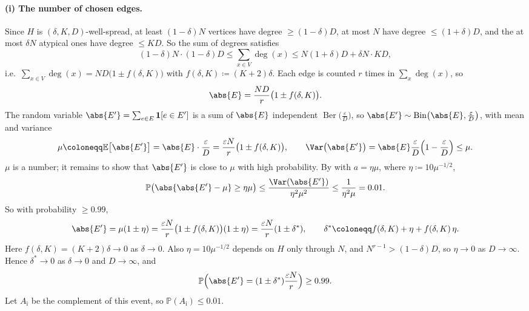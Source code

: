 \paragraph{(i) The number of chosen edges.} Since \(H\) is \((\delta, K, D)\)-well-spread, at least \((1 - \delta) N\) vertices have degree \(\ge (1 - \delta) D\), at most \(N\) have degree \(\le (1 + \delta) D\), and the at most \(\delta N\) atypical ones have degree \(\le K D\). So the sum of degrees satisfies
\[
    (1 - \delta) N \cdot (1 - \delta) D \le \sum_{x \in V} \deg(x) \le N (1 + \delta) D + \delta N \cdot K D ,
\]
i.e.\ \(\sum_{x \in V} \deg(x) = N D \bigl( 1 \pm f(\delta, K) \bigr)\)
with \(f(\delta, K) \coloneqq (K + 2)\delta\). Each edge is counted \(r\) times in \(\sum_{x} \deg(x)\), so
\[
    \abs{E} = \frac{N D}{r} \bigl( 1 \pm f(\delta, K) \bigr).
\]
The random variable \(\abs{E'} = \sum_{e \in E} \mathbf{1}[e \in E']\) is a sum of \(\abs{E}\) independent \(\operatorname{Ber}\bigl( \frac{\varepsilon}{D} \bigr)\), so \(\abs{E'} \sim \operatorname{Bin}\bigl( \abs{E}, \frac{\varepsilon}{D} \bigr)\), with mean and variance
\[
    \mu \coloneqq \mathbb{E}\bigl[ \abs{E'} \bigr] = \abs{E} \cdot \frac{\varepsilon}{D} = \frac{\varepsilon N}{r} \bigl( 1 \pm f(\delta, K) \bigr),
    \qquad
    \Var\bigl( \abs{E'} \bigr) = \abs{E} \frac{\varepsilon}{D} \Bigl( 1 - \frac{\varepsilon}{D} \Bigr) \le \mu .
\]
\(\mu\) is a number; it remains to show that \(\abs{E'}\) is close to \(\mu\) with high probability. By  with \(a = \eta \mu\), where \(\eta \coloneqq 10 \mu^{-1/2}\),
\[
    \mathbb{P}\bigl( \abs{\abs{E'} - \mu} \ge \eta \mu \bigr) \le \frac{\Var(\abs{E'})}{\eta^{2} \mu^{2}} \le \frac{1}{\eta^{2} \mu} = 0.01 .
\]
So with probability \(\ge 0.99\),
\[
    \abs{E'} = \mu (1 \pm \eta) = \frac{\varepsilon N}{r} \bigl( 1 \pm f(\delta, K) \bigr)(1 \pm \eta) = \frac{\varepsilon N}{r} (1 \pm \delta^{*}),
    \qquad
    \delta^{*} \coloneqq f(\delta, K) + \eta + f(\delta, K)\, \eta .
\]
Here \(f(\delta, K) = (K+2)\delta \to 0\) as \(\delta \to 0\). Also \(\eta = 10\mu^{-1/2}\) depends on \(H\) only through \(N\), and \(N^{r-1} > (1 - \delta) D\), so \(\eta \to 0\) as \(D \to \infty\). Hence \(\delta^{*} \to 0\) as \(\delta \to 0\) and \(D \to \infty\), and
\[
    \mathbb{P}\Bigl( \abs{E'} = (1 \pm \delta^{*}) \frac{\varepsilon N}{r} \Bigr) \ge 0.99 .
\]
Let \(A_{\mathrm{i}}\) be the complement of this event, so \(\mathbb{P}(A_{\mathrm{i}}) \le 0.01\).


